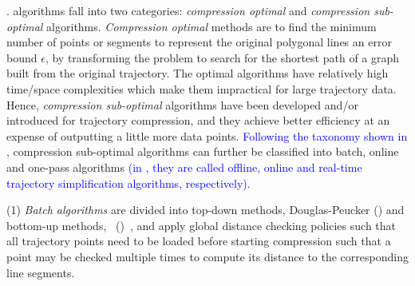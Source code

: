 %


. \lsa algorithms fall into two categories: \textit{compression optimal} and \textit{compression sub-optimal} algorithms.
\textit{Compression optimal} methods \cite{Imai:Optimal,Chan:Optimal} are to find the minimum number of points or segments to represent the original polygonal lines \wrt an error bound $\epsilon$, by transforming the problem to search for the shortest path of a graph built from the original trajectory.
The optimal \lsa algorithms have relatively high time/space complexities which make them impractical for large trajectory data.
Hence, \textit{compression sub-optimal} algorithms have been developed and/or introduced for trajectory compression, and they achieve better efficiency at an expense of outputting a little more data points. \textcolor{blue}{Following the taxonomy shown in \cite{Lange:Tracking, Lin:Operb, Lin:Cised}}, compression sub-optimal algorithms can further be classified into batch, online and one-pass algorithms \textcolor{blue}{(in \cite{Lange:Tracking}, they are called offline, online and real-time trajectory simplification algorithms, respectively)}.

\sstab (1) {\em Batch algorithms} are divided into top-down methods, \eg Douglas-Peucker (\dpa) \cite{Douglas:Peucker,Meratnia:Spatiotemporal} and bottom-up methods, \eg\ \pavlidis (\tpa)~\cite{Pavlidis:Segment}, and apply global distance checking policies such that all trajectory points need to be loaded before starting compression such that a point may be checked multiple times to compute its distance to the corresponding line segments.

